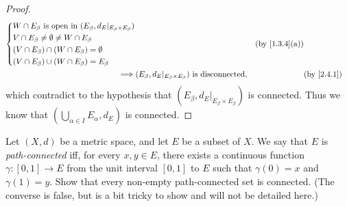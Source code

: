 \begin{proof}
\begin{align*}
\begin{dcases}
                 W \cap E_\beta \text{ is open in } (E_\beta, d_E|_{E_\beta \times E_\beta}) \\
                 V \cap E_\beta \neq \emptyset \neq W \cap E_\beta                           \\
                 (V \cap E_\beta) \cap (W \cap E_\beta) = \emptyset                          \\
                 (V \cap E_\beta) \cup (W \cap E_\beta) = E_\beta
               \end{dcases} &  & \text{(by \cref{1.3.4}(a))}                                  \\
    \implies & (E_\beta, d_E|_{E_\beta \times E_\beta}) \text{ is disconnected},              &  & \text{(by \cref{2.4.1})}
  \end{align*}
  which contradict to the hypothesis that \((E_\beta, d_E|_{E_\beta \times E_\beta})\) is connected.
  Thus we know that \((\bigcup_{\alpha \in I} E_\alpha, d_E)\) is connected.
\end{proof}

\begin{ex}\label{ex:2.4.7}
  Let \((X, d)\) be a metric space, and let \(E\) be a subset of \(X\).
  We say that \(E\) is \emph{path-connected} iff, for every \(x, y \in E\), there exists a continuous function \(\gamma : [0, 1] \to E\) from the unit interval \([0, 1]\) to \(E\) such that \(\gamma(0) = x\) and \(\gamma(1) = y\).
  Show that every non-empty path-connected set is connected.
  (The converse is false, but is a bit tricky to show and will not be detailed here.)
\end{ex}


